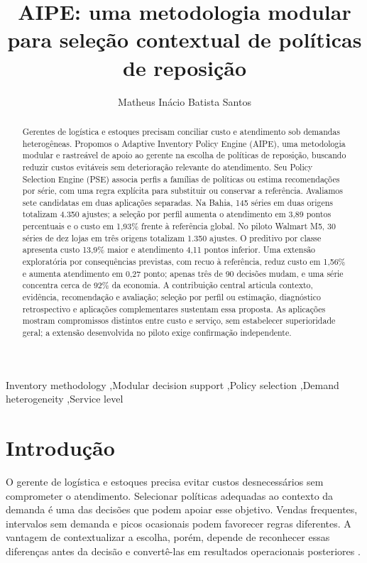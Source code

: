 \documentclass[preprint,12pt]{elsarticle}
\begin{document}
\begin{frontmatter}
\title{AIPE: uma metodologia modular para seleção contextual de políticas de reposição}
\author[ufal]{Matheus Inácio Batista Santos}
\begin{abstract}
Gerentes de logística e estoques precisam conciliar custo e atendimento sob demandas heterogêneas. Propomos o Adaptive Inventory Policy Engine (AIPE), uma metodologia modular e rastreável de apoio ao gerente na escolha de políticas de reposição, buscando reduzir custos evitáveis sem deterioração relevante do atendimento. Seu Policy Selection Engine (PSE) associa perfis a famílias de políticas ou estima recomendações por série, com uma regra explícita para substituir ou conservar a referência. Avaliamos sete candidatas em duas aplicações separadas. Na Bahia, 145 séries em duas origens totalizam 4.350 ajustes; a seleção por perfil aumenta o atendimento em 3,89 pontos percentuais e o custo em 1,93\% frente à referência global. No piloto Walmart M5, 30 séries de dez lojas em três origens totalizam 1.350 ajustes. O preditivo por classe apresenta custo 13,9\% maior e atendimento 4,11 pontos inferior. Uma extensão exploratória por consequências previstas, com recuo à referência, reduz custo em 1,56\% e aumenta atendimento em 0,27 ponto; apenas três de 90 decisões mudam, e uma série concentra cerca de 92\% da economia. A contribuição central articula contexto, evidência, recomendação e avaliação; seleção por perfil ou estimação, diagnóstico retrospectivo e aplicações complementares sustentam essa proposta. As aplicações mostram compromissos distintos entre custo e serviço, sem estabelecer superioridade geral; a extensão desenvolvida no piloto exige confirmação independente.

\end{abstract}
\begin{keyword}
Inventory methodology \sep Modular decision support \sep Policy selection \sep Demand heterogeneity \sep Service level
\end{keyword}
\end{frontmatter}

\section{Introdução}
O gerente de logística e estoques precisa evitar custos desnecessários sem comprometer o atendimento. Selecionar políticas adequadas ao contexto da demanda é uma das decisões que podem apoiar esse objetivo. Vendas frequentes, intervalos sem demanda e picos ocasionais podem favorecer regras diferentes. A vantagem de contextualizar a escolha, porém, depende de reconhecer essas diferenças antes da decisão e convertê-las em resultados operacionais posteriores \cite{Axsater2006InventoryControl}.
\end{document}
